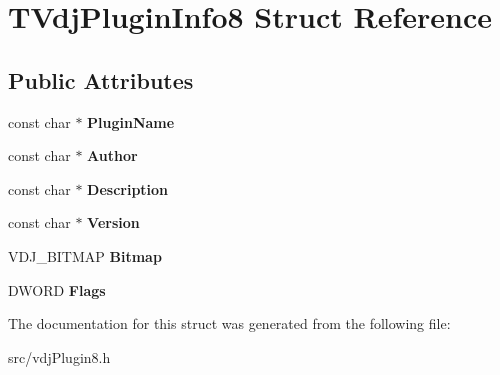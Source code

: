 \hypertarget{structTVdjPluginInfo8}{}\section{T\+Vdj\+Plugin\+Info8 Struct Reference}
\label{structTVdjPluginInfo8}
\subsection*{Public Attributes}
\begin{DoxyCompactItemize}
\item 
\mbox{\label{structTVdjPluginInfo8_af7403b3d59f6da967de77f19868359f5}} 
const char $\ast$ {\bfseries Plugin\+Name}
\item 
\mbox{\label{structTVdjPluginInfo8_a3be0cc20dfaab62bc6510e8f449a0e6a}} 
const char $\ast$ {\bfseries Author}
\item 
\mbox{\label{structTVdjPluginInfo8_a2767a222a128c408edf3fc2bdbd2dcef}} 
const char $\ast$ {\bfseries Description}
\item 
\mbox{\label{structTVdjPluginInfo8_afa7487e56ec5a59847c2d2a6d26b14c7}} 
const char $\ast$ {\bfseries Version}
\item 
\mbox{\label{structTVdjPluginInfo8_a49d2d881bb18dcc5aad708c284ce5027}} 
V\+D\+J\+\_\+\+B\+I\+T\+M\+AP {\bfseries Bitmap}
\item 
\mbox{\label{structTVdjPluginInfo8_ae47053f7b918d945c553f226960bfb6e}} 
D\+W\+O\+RD {\bfseries Flags}
\end{DoxyCompactItemize}


The documentation for this struct was generated from the following file\+:\begin{DoxyCompactItemize}
\item 
src/vdj\+Plugin8.\+h\end{DoxyCompactItemize}
